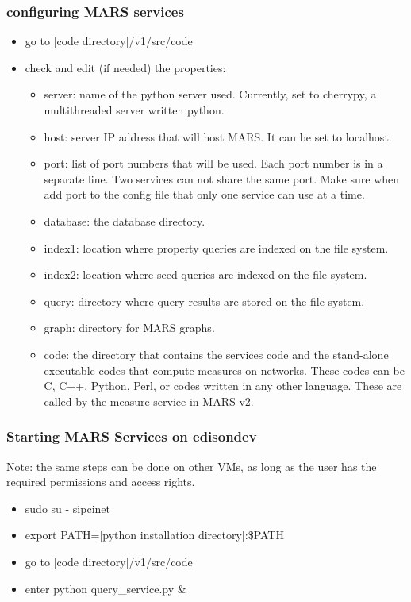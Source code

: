 \subsubsection{configuring MARS services}
\begin{itemize}
\item go to [code directory]/v1/src/code
\item check and edit (if needed) the properties:
\begin{itemize}
\item server: name of the python server used. Currently, set to cherrypy, a multithreaded server written python.
\item host: server IP address that will host MARS. It can be set to localhost. 
\item port: list of port numbers that will be used. Each port number is in a separate line. Two services can not share the same port. Make sure when add port to the config file that only one service can use at a time.
\item database: the database directory.
\item index1: location where property queries are indexed on the file system.
\item index2: location where seed queries are indexed on the file system.
\item query: directory where query results are stored on the file system.
\item graph: directory for MARS graphs.
\item code: the directory that contains the services code and the stand-alone executable codes that compute measures on networks.  These codes can be C, C++, Python, Perl, or codes written in any other language.  These are called by the measure service in MARS v2. 

\end{itemize}
\end{itemize}

\subsubsection{Starting MARS Services on edisondev}
Note: the same steps can be done on other VMs, as long as the user has the required permissions and access rights.
\begin{itemize}
\item sudo su - sipcinet
\item export PATH=[python installation directory]:\$PATH
\item go to [code directory]/v1/src/code
\item enter python query\_service.py \&
\end{itemize}




